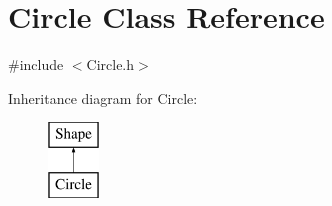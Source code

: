 \hypertarget{class_circle}{}\section{Circle Class Reference}
\label{class_circle}


{\ttfamily \#include $<$Circle.\+h$>$}

Inheritance diagram for Circle\+:\begin{figure}[H]
\begin{center}
\leavevmode
\includegraphics[height=2.000000cm]{class_circle}
\end{center}
\end{figure}
